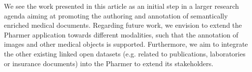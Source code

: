 \documentclass[10pt, conference, compsocconf]{IEEEtran}
\begin{document}
We see the work presented in this article as an initial step in a larger research agenda aiming at promoting the authoring and annotation of semantically enriched medical documents.
Regarding future work, we envision to extend the Pharmer application towards different modalities, such that the annotation of images and other medical objects is supported.
Furthermore, we aim to integrate the other existing linked open datasets (e.g. related to publications, laboratories or insurance documents) into the Pharmer to extend its stakeholders.


\begin{spacing}{0.4}


\end{spacing}


\end{document}
